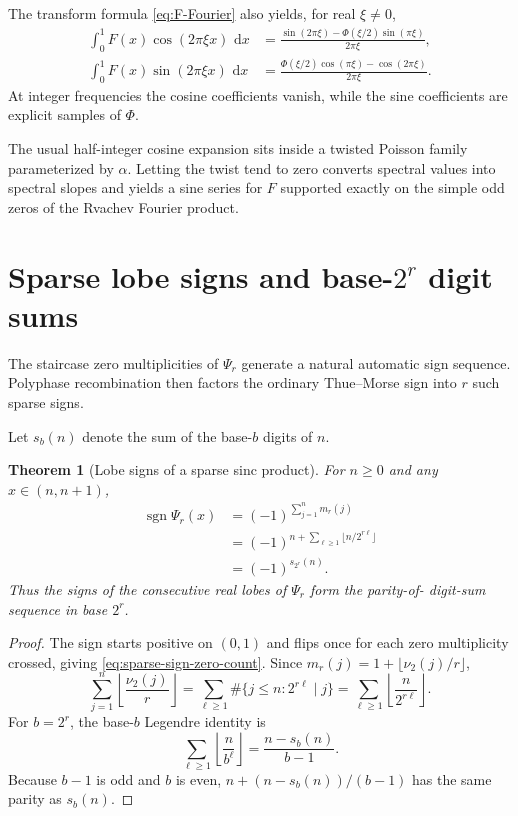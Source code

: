 \documentclass[11pt,oneside]{article}
\numberwithin{equation}{section}
\newtheorem{theorem}{Theorem}[section]
\theoremstyle{definition}
\theoremstyle{remark}
\newcommand{\sgn}{\operatorname{sgn}}
\newcommand{\dd}{\,\mathrm d}
\begin{document}
The transform formula \eqref{eq:F-Fourier} also yields, for real $\xi\ne0$,
\begin{align}
 \int_0^1F(x)\cos(2\pi\xi x)\,\dd x
 &=\frac{\sin(2\pi\xi)-\Phi(\xi/2)\sin(\pi\xi)}{2\pi\xi}, \label{eq:F-cos-transform}\\
 \int_0^1F(x)\sin(2\pi\xi x)\,\dd x
 &=\frac{\Phi(\xi/2)\cos(\pi\xi)-\cos(2\pi\xi)}{2\pi\xi}. \label{eq:F-sin-transform}
\end{align}
At integer frequencies the cosine coefficients vanish, while the sine
coefficients are explicit samples of $\Phi$.

\begin{resultbox}
The usual half-integer cosine expansion sits inside a twisted Poisson family
parameterized by $\alpha$.  Letting the twist tend to zero converts spectral
values into spectral slopes and yields a sine series for $F$ supported exactly
on the simple odd zeros of the Rvachev Fourier product.
\end{resultbox}

\section{Sparse lobe signs and base-\texorpdfstring{$2^r$}{2-to-the-r} digit sums}
\label{sec:sparse-signs}

The staircase zero multiplicities of $\Psi_r$ generate a natural automatic
sign sequence.  Polyphase recombination then factors the ordinary Thue--Morse
sign into $r$ such sparse signs.

Let $s_b(n)$ denote the sum of the base-$b$ digits of $n$.

\begin{theorem}[Lobe signs of a sparse sinc product]
\label{thm:sparse-lobe-sign}
For $n\ge0$ and any $x\in(n,n+1)$,
\begin{align}
 \sgn\Psi_r(x)
 &=(-1)^{\sum_{j=1}^{n}m_r(j)}                             \label{eq:sparse-sign-zero-count}\\
 &=(-1)^{n+\sum_{\ell\ge1}\lfloor n/2^{r\ell}\rfloor}    \label{eq:sparse-sign-floor}\\
 &=\boxed{(-1)^{s_{2^r}(n)}}.                             \label{eq:sparse-sign-base}
\end{align}
Thus the signs of the consecutive real lobes of $\Psi_r$ form the parity-of-
digit-sum sequence in base $2^r$.
\end{theorem}

\begin{proof}
The sign starts positive on $(0,1)$ and flips once for each zero multiplicity
crossed, giving \eqref{eq:sparse-sign-zero-count}.  Since
$m_r(j)=1+\lfloor\nu_2(j)/r\rfloor$,
\[
 \sum_{j=1}^{n}\left\lfloor\frac{\nu_2(j)}r\right\rfloor
 =\sum_{\ell\ge1}\#\{j\le n:2^{r\ell}\mid j\}
 =\sum_{\ell\ge1}\left\lfloor\frac n{2^{r\ell}}\right\rfloor.
\]
For $b=2^r$, the base-$b$ Legendre identity is
\[
 \sum_{\ell\ge1}\left\lfloor\frac n{b^\ell}\right\rfloor
 =\frac{n-s_b(n)}{b-1}.
\]
Because $b-1$ is odd and $b$ is even,
$n+(n-s_b(n))/(b-1)$ has the same parity as $s_b(n)$.
\end{proof}
\end{document}

